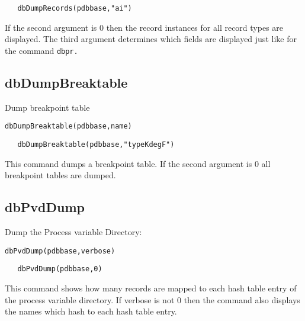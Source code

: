 \begin{verbatim}   dbDumpRecords(pdbbase,"ai")
\end{verbatim}If the second argument is 0 then the record instances for all record types are displayed. The third argument determines 
which fields are displayed just like for the command \verb|dbpr.|

\subsection{dbDumpBreaktable}

Dump breakpoint table

\begin{verbatim}dbDumpBreaktable(pdbbase,name)
\end{verbatim}

\begin{verbatim}   dbDumpBreaktable(pdbbase,"typeKdegF")
\end{verbatim}This command dumps a breakpoint table. If the second argument is 0 all breakpoint tables are dumped.

\subsection{dbPvdDump}

Dump the Process variable Directory:

\begin{verbatim}dbPvdDump(pdbbase,verbose)
\end{verbatim}

\begin{verbatim}   dbPvdDump(pdbbase,0)
\end{verbatim}This command shows how many records are mapped to each hash table entry of the process variable directory. If verbose 
is not 0 then the command also displays the names which hash to each hash table entry.




